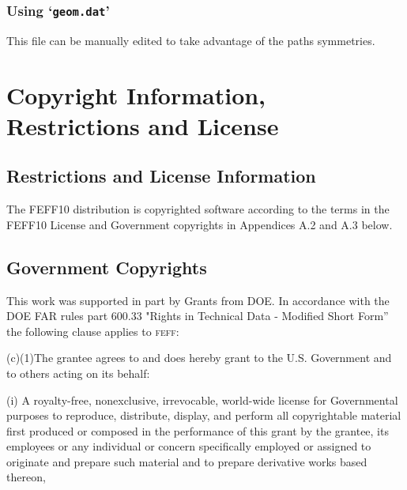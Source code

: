 \documentclass[11pt,oneside]{report} %
\newcommand{\program}[1]{\textsc{#1}}
\newcommand{\feff}{\program{feff}}
\newcommand{\file}[1]{`\texttt{#1}'}
\begin{document}
\begin{latexonly}
\subsection{Using \file{geom.dat}}
\label{sec:geom.dat}

This file can be manually edited to take advantage of the paths
symmetries. %










\appendix

\chapter{Copyright Information,  Restrictions and License}
\label{sec:Append-A-Copyr}

\section{Restrictions and License Information}
\label{sec:Restr-License-Inform}

The FEFF10 distribution is copyrighted software according to the terms in the FEFF10 License and Government copyrights in Appendices A.2 and A.3 below.  

\section{Government Copyrights}
\label{sec:Governm-Copyr}

This work was supported in part by Grants from DOE. In accordance with
the DOE FAR rules part 600.33 "Rights in Technical Data - Modified
Short Form'' the following clause applies to {\feff}:

(c)(1)The grantee agrees to and does hereby grant to the U.S.
Government and to others acting on its behalf:

(i) A royalty-free, nonexclusive, irrevocable, world-wide license for
Governmental purposes to reproduce, distribute, display, and perform
all copyrightable material first produced or composed in the
performance of this grant by the grantee, its employees or any
individual or concern specifically employed or assigned to originate
and prepare such material and to prepare derivative works based
thereon,


\end{latexonly}
\end{document}
